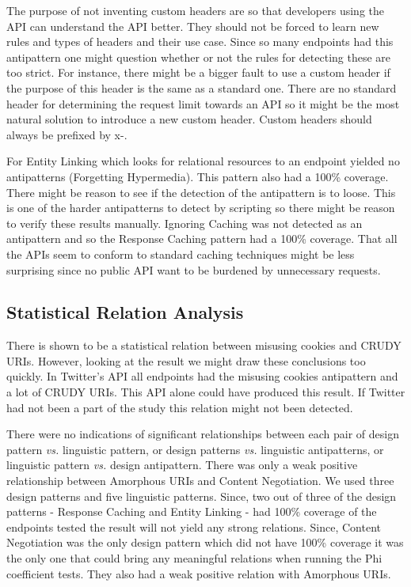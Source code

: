 The purpose of not inventing custom headers are so that developers using the API can understand the API better. They should not be forced to learn new rules and types of headers and their use case. Since so many endpoints had this antipattern one might question whether or not the rules for detecting these are too strict. For instance, there might be a bigger fault to use a custom header if the purpose of this header is the same as a standard one. There are no standard header for determining the request limit towards an API so it might be the most natural solution to introduce a new custom header. Custom headers should always be prefixed by x-.

For Entity Linking which looks for relational resources to an endpoint yielded no antipatterns (Forgetting Hypermedia). This pattern also had a 100\% coverage. There might be reason to see if the detection of the antipattern is to loose. This is one of the harder antipatterns to detect by scripting so there might be reason to verify these results manually. Ignoring Caching was not detected as an antipattern and so the Response Caching pattern had a 100\% coverage. That all the APIs seem to conform to standard caching techniques might be less surprising since no public API want to be burdened by unnecessary requests.

\subsection{Statistical Relation Analysis}
\label{StatisticalRelationAnalysis}

There is shown to be a statistical relation between misusing cookies and CRUDY URIs. However, looking at the result we might draw these conclusions too quickly. In Twitter's API all endpoints had the misusing cookies antipattern and a lot of CRUDY URIs. This API alone could have produced this result. If Twitter had not been a part of the study this relation might not been detected.

There were no indications of significant relationships between each pair of design pattern \textit{vs.} linguistic pattern, or design patterns \textit{vs.} linguistic antipatterns, or linguistic pattern \textit{vs.} design antipattern. There was only a weak positive relationship between Amorphous URIs and Content Negotiation. We used three design patterns and five linguistic patterns. Since, two out of three of the design patterns - Response Caching and Entity Linking - had 100\% coverage of the endpoints tested the result will not yield any strong relations. Since, Content Negotiation was the only design pattern which did not have 100\% coverage it was the only one that could bring any meaningful relations when running the Phi coefficient tests. They also had a weak positive relation with Amorphous URIs.

